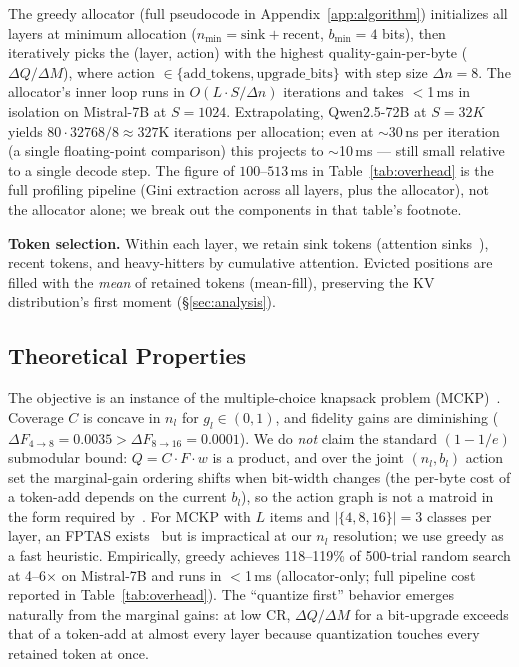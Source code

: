 \documentclass{article}
\newcommand{\nlayers}{L}
\begin{document}
The greedy allocator (full pseudocode in Appendix~\ref{app:algorithm}) initializes all layers at minimum allocation ($n_{\min} = \text{sink} + \text{recent}$, $b_{\min} = 4$ bits), then iteratively picks the (layer, action) with the highest quality-gain-per-byte ($\Delta Q / \Delta M$), where action $\in \{\text{add\_tokens}, \text{upgrade\_bits}\}$ with step size $\Delta n = 8$.
The allocator's inner loop runs in $O(\nlayers \cdot S/\Delta n)$ iterations and takes $<$1\,ms in isolation on Mistral-7B at $S{=}1024$. Extrapolating, Qwen2.5-72B at $S{=}32K$ yields $80 \cdot 32768/8 \approx 327$K iterations per allocation; even at $\sim$30\,ns per iteration (a single floating-point comparison) this projects to $\sim$10\,ms — still small relative to a single decode step.
The figure of $100$--$513$\,ms in Table~\ref{tab:overhead} is the full profiling pipeline (Gini extraction across all layers, plus the allocator), not the allocator alone; we break out the components in that table's footnote.

\textbf{Token selection.}
Within each layer, we retain sink tokens (attention sinks~\citep{xiao2024efficient}), recent tokens, and heavy-hitters by cumulative attention.
Evicted positions are filled with the \emph{mean} of retained tokens (mean-fill), preserving the KV distribution's first moment (\S\ref{sec:analysis}).

\subsection{Theoretical Properties}
\label{sec:theory}

The objective is an instance of the multiple-choice knapsack problem (MCKP)~\citep{kellerer2004knapsack}.
Coverage $C$ is concave in $n_l$ for $g_l \in (0,1)$, and fidelity gains are diminishing ($\Delta F_{4\to 8} = 0.0035 > \Delta F_{8\to 16} = 0.0001$).
We do \emph{not} claim the standard $(1{-}1/e)$ submodular bound: $Q = C\!\cdot\!F\!\cdot\!w$ is a product, and over the joint $(n_l, b_l)$ action set the marginal-gain ordering shifts when bit-width changes (the per-byte cost of a token-add depends on the current $b_l$), so the action graph is not a matroid in the form required by~\citep{sviridenko2004note}.
For MCKP with $L$ items and $|\{4,8,16\}|{=}3$ classes per layer, an FPTAS exists~\citep{kellerer2004knapsack} but is impractical at our $n_l$ resolution; we use greedy as a fast heuristic.
Empirically, greedy achieves 118--119\% of 500-trial random search at 4--6$\times$ on Mistral-7B and runs in $<$1\,ms (allocator-only; full pipeline cost reported in Table~\ref{tab:overhead}).
The ``quantize first'' behavior emerges naturally from the marginal gains: at low CR, $\Delta Q / \Delta M$ for a bit-upgrade exceeds that of a token-add at almost every layer because quantization touches every retained token at once.
\end{document}
